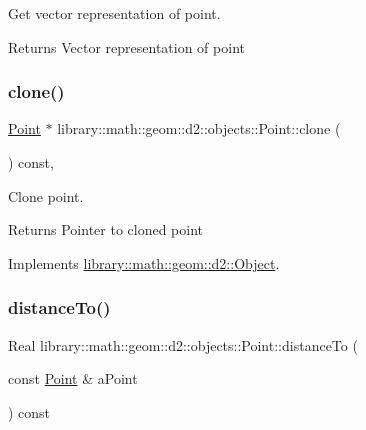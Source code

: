 Get vector representation of point. 

\begin{DoxyReturn}{Returns}
Vector representation of point 
\end{DoxyReturn}
\mbox{\label{classlibrary_1_1math_1_1geom_1_1d2_1_1objects_1_1_point_aa6b55bdbf5a0ce9ec8bc91ca79de3569}} 
\subsubsection{\texorpdfstring{clone()}{clone()}}
{\footnotesize\ttfamily \hyperlink{classlibrary_1_1math_1_1geom_1_1d2_1_1objects_1_1_point}{Point} $\ast$ library\+::math\+::geom\+::d2\+::objects\+::\+Point\+::clone (\begin{DoxyParamCaption}{ }\end{DoxyParamCaption}) const\hspace{0.3cm}{\ttfamily [override]}, {\ttfamily [virtual]}}



Clone point. 

\begin{DoxyReturn}{Returns}
Pointer to cloned point 
\end{DoxyReturn}


Implements \hyperlink{classlibrary_1_1math_1_1geom_1_1d2_1_1_object_a5c26ae4120edb24f6463d65a9cef247d}{library\+::math\+::geom\+::d2\+::\+Object}.

\mbox{\label{classlibrary_1_1math_1_1geom_1_1d2_1_1objects_1_1_point_a1615c904b4f5a1c406cdba97df6445d8}} 
\subsubsection{\texorpdfstring{distance\+To()}{distanceTo()}}
{\footnotesize\ttfamily Real library\+::math\+::geom\+::d2\+::objects\+::\+Point\+::distance\+To (\begin{DoxyParamCaption}\item[{const \hyperlink{classlibrary_1_1math_1_1geom_1_1d2_1_1objects_1_1_point}{Point} \&}]{a\+Point }\end{DoxyParamCaption}) const}



